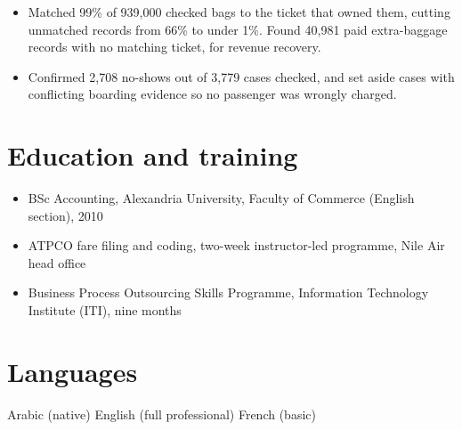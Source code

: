 \begin{itemize}
  \item Matched 99\% of 939,000 checked bags to the ticket that owned them, cutting unmatched records from 66\% to under 1\%. Found 40,981 paid extra-baggage records with no matching ticket, for revenue recovery.
  \item Confirmed 2,708 no-shows out of 3,779 cases checked, and set aside cases with conflicting boarding evidence so no passenger was wrongly charged.
\end{itemize}

\section{Education and training}
\begin{itemize}
  \item BSc Accounting, Alexandria University, Faculty of Commerce (English section), 2010
  \item ATPCO fare filing and coding, two-week instructor-led programme, Nile Air head office
  \item Business Process Outsourcing Skills Programme, Information Technology Institute (ITI), nine months
\end{itemize}

\section{Languages}
Arabic (native) \textperiodcentered{} English (full professional) \textperiodcentered{} French (basic)\par



